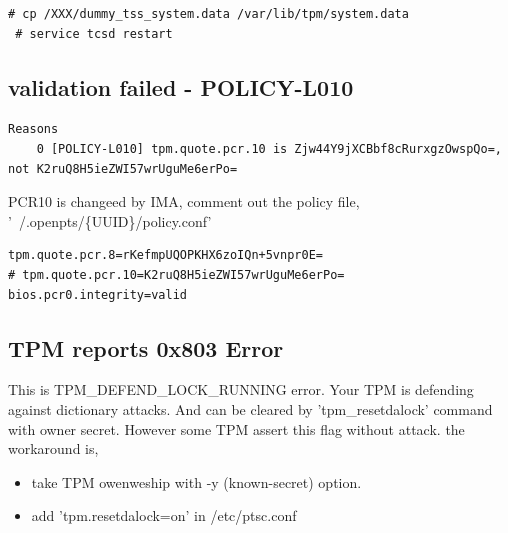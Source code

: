 \documentclass[10pt,a4paper]{article}
\begin{document}
\begin{lstlisting}[style=source_code]
 # cp /XXX/dummy_tss_system.data /var/lib/tpm/system.data
 # service tcsd restart
\end{lstlisting}

\subsection{validation failed - POLICY-L010}
\begin{lstlisting}[style=source_code]
Reasons
    0 [POLICY-L010] tpm.quote.pcr.10 is Zjw44Y9jXCBbf8cRurxgzOwspQo=, not K2ruQ8H5ieZWI57wrUguMe6erPo=
\end{lstlisting}

PCR10 is changeed by IMA, comment out the policy file, 
'~/.openpts/\{UUID\}/policy.conf'

\begin{lstlisting}[style=source_code]
tpm.quote.pcr.8=rKefmpUQOPKHX6zoIQn+5vnpr0E=
# tpm.quote.pcr.10=K2ruQ8H5ieZWI57wrUguMe6erPo=
bios.pcr0.integrity=valid
\end{lstlisting}

\subsection{TPM reports 0x803 Error}
This is TPM\_DEFEND\_LOCK\_RUNNING error. Your TPM is defending against dictionary attacks.
And can be cleared by 'tpm\_resetdalock' command with owner secret.
However some TPM assert this flag without attack. the workaround is,
\begin{itemize}
\item take TPM owenweship with -y (known-secret) option.
\item add 'tpm.resetdalock=on' in /etc/ptsc.conf
\end{itemize}
\end{document}
